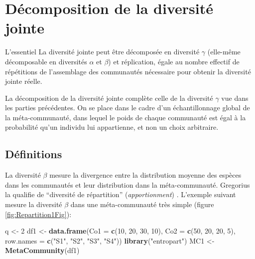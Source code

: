 \documentclass[
  11pt,
  french,
  a4paper,
  extrafontsizes,onecolumn,openright
  ]{memoir}
\newenvironment{Shaded}{\begin{snugshade}}{\end{snugshade}}
\newcommand{\AttributeTok}[1]{\textcolor[rgb]{0.13,0.29,0.53}{#1}}
\newcommand{\DecValTok}[1]{\textcolor[rgb]{0.00,0.00,0.81}{#1}}
\newcommand{\FunctionTok}[1]{\textcolor[rgb]{0.13,0.29,0.53}{\textbf{#1}}}
\newcommand{\NormalTok}[1]{#1}
\newcommand{\OtherTok}[1]{\textcolor[rgb]{0.56,0.35,0.01}{#1}}
\newcommand{\StringTok}[1]{\textcolor[rgb]{0.31,0.60,0.02}{#1}}
\newenvironment{Summary}
  {\begin{bclogo}[logo=\bctrombone, noborder=true, couleur=lightgray!50]{L'essentiel}\parindent0pt}
  {\end{bclogo}}
\begin{document}
\chapter{Décomposition de la diversité jointe}\label{chap-DiversiteJointe}

\begin{Summary}
La diversité jointe peut être décomposée en diversité \(\gamma\) (elle-même décomposable en diversités \(\alpha\) et \(\beta\)) et réplication, égale au nombre effectif de répétitions de l'assemblage des communautés nécessaire pour obtenir la diversité jointe réelle.

\end{Summary}

La décomposition de la diversité jointe \autocite{Gregorius2009a,Gregorius2010} complète celle de la diversité \(\gamma\) vue dans les parties précédentes.
On se place dans le cadre d'un échantillonnage global de la méta-communauté, dans lequel le poids de chaque communauté est égal à la probabilité qu'un individu lui appartienne, et non un choix arbitraire.

\section{Définitions}\label{sec-Definitions}

La diversité \(\beta\) mesure la divergence entre la distribution moyenne des espèces dans les communautés et leur distribution dans la méta-communauté.
Gregorius la qualifie de ``diversité de répartition'' (\emph{apportionment}) \autocite{Gregorius2014}.
L'exemple suivant mesure la diversité \(\beta\) dans une méta-communauté très simple (figure \ref{fig:Repartition1Fig}):

\scriptsize

\begin{Shaded}
\begin{Highlighting}[]
\NormalTok{q }\OtherTok{\textless{}{-}} \DecValTok{2}
\NormalTok{df1 }\OtherTok{\textless{}{-}} \FunctionTok{data.frame}\NormalTok{(}\AttributeTok{Co1 =} \FunctionTok{c}\NormalTok{(}\DecValTok{10}\NormalTok{, }\DecValTok{20}\NormalTok{, }\DecValTok{30}\NormalTok{, }\DecValTok{10}\NormalTok{), }\AttributeTok{Co2 =} \FunctionTok{c}\NormalTok{(}\DecValTok{50}\NormalTok{, }\DecValTok{20}\NormalTok{, }\DecValTok{20}\NormalTok{,}
    \DecValTok{5}\NormalTok{), }\AttributeTok{row.names =} \FunctionTok{c}\NormalTok{(}\StringTok{"S1"}\NormalTok{, }\StringTok{"S2"}\NormalTok{, }\StringTok{"S3"}\NormalTok{, }\StringTok{"S4"}\NormalTok{))}
\FunctionTok{library}\NormalTok{(}\StringTok{"entropart"}\NormalTok{)}
\NormalTok{MC1 }\OtherTok{\textless{}{-}} \FunctionTok{MetaCommunity}\NormalTok{(df1)}
\end{Highlighting}
\end{Shaded}
\end{document}
